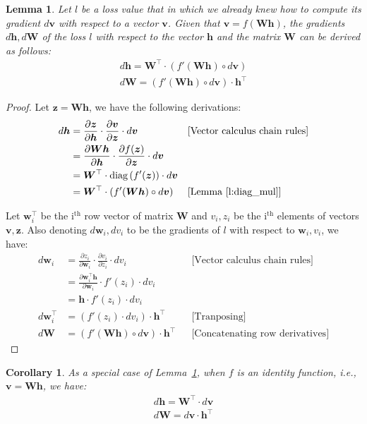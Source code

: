 \documentclass[12pt]{report}
\newcommand{\lemmaref}[1]{Lemma~\ref{#1}}
\newcommand{\fracder}[2]{\frac{\partial #1}{\partial #2}}
\newcommand{\tp}[1]{#1^\top}
\newcommand{\paren}[1]{\left(#1\right)}
\newcommand{\der}[1]{d\bm{#1}}
\newcommand{\edot}{\circ}
\newtheorem{lemma}{Lemma}
\newtheorem{corollary}{Corollary}
\begin{document}
\begin{lemma}
\label{l:chain_rule}
Let $l$ be a loss value that  in which we
already knew how to compute its gradient $\der{v}$ with respect to a vector $\bm{v}$. Given that
$\bm{v} = f(\bm{Wh})$, the gradients $\der{h}, \der{W}$ of the loss $l$ with respect to the vector
$\bm{h}$ and the matrix $\bm{W}$ can be derived as follows:
\begin{align}
\der{h} = \tp{\bm{W}} \cdot \paren{f'(\bm{Wh}) \edot \der{v}}
\\
\der{W} = \paren{f'(\bm{Wh}) \edot \der{v}} \cdot \tp{\bm{h}} 
\end{align}
\end{lemma}

\begin{proof}
Let $\bm{z} = \bm{Wh}$, we have the following derivations: %
\begin{align*}
\der{h} &= \fracder{\bm{z}}{\bm{h}} \cdot \fracder{\bm{v}}{\bm{z}}
\cdot \der{v} && \text{[Vector calculus chain rules]}\\
&= \fracder{\bm{Wh}}{\bm{h}} \cdot \fracder{f(\bm{z})}{\bm{z}}
\cdot \der{v} \\
&=\tp{\bm{W}} \cdot \diag \paren{f'(\bm{z})} \cdot \der{v} \\
&=\tp{\bm{W}} \cdot \paren{f'(\bm{Wh}) \edot \der{v}} &&
\text{[\lemmaref{l:diag_mul}]}
\end{align*}

Let $\tp{\bm{w}_i}$ be the i$^{\text{th}}$ row vector of matrix $\bm{W}$ and
$v_i, z_i$ be the i$^{\text{th}}$ elements of vectors $\bm{v}, \bm{z}$. Also
denoting $\der{w}_i, dv_i$ to be the gradients of $l$ with respect to $\bm{w}_i,
v_i$, we have:
\begin{align*}
d\bm{w}_i &= \fracder{z_i}{\bm{w}_i} \cdot \fracder{v_i}{z_i}
\cdot dv_i && \text{[Vector calculus chain rules]}\\
&= \fracder{\tp{\bm{w}_i}\bm{h}}{\bm{w}_i} \cdot f'(z_i) \cdot dv_i \\
&= \bm{h} \cdot f'(z_i) \cdot dv_i \\ 
d\tp{\bm{w}_i} &= \paren{f'(z_i) \cdot dv_i} \cdot
\tp{\bm{h}} && \text{[Tranposing]} \\
\der{W} &= \paren{f'(\bm{Wh}) \edot \der{v}} \cdot \tp{\bm{h}}
&& \text{[Concatenating row derivatives]}
\end{align*}
\end{proof}

\begin{corollary}
\label{c:chain_rule}
As a special case of \lemmaref{l:chain_rule}, when $f$ is an identity function,
i.e., $\bm{v} = \bm{Wh}$, we have:
\begin{align}
\der{h} = \tp{\bm{W}} \cdot \der{v}
\\
\der{W} = \der{v} \cdot \tp{\bm{h}} 
\end{align}
\end{corollary}
\end{document}
